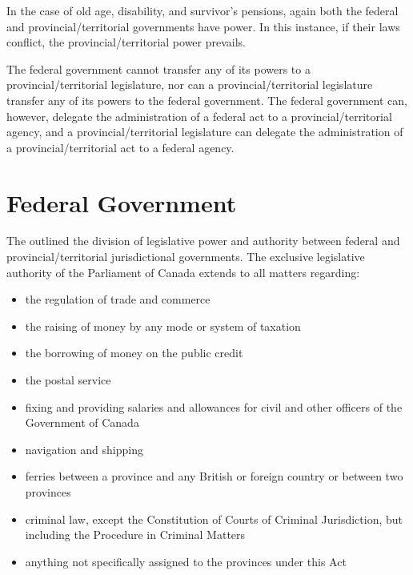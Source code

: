 \documentclass[letterpaper,10pt,english]{sphinxmanual}
\begin{document}
\sphinxAtStartPar
In the case of old age, disability, and survivor’s pensions, again both the federal and
provincial/territorial governments have power. In this instance, if their laws conflict, the
provincial/territorial power prevails.

\sphinxAtStartPar
The federal government cannot transfer any of its powers to a provincial/territorial
legislature, nor can a provincial/territorial legislature transfer any of its powers to the federal
government. The federal government can, however, delegate the administration of a federal
act to a provincial/territorial agency, and a provincial/territorial legislature can delegate the
administration of a provincial/territorial act to a federal agency.


\section{Federal Government}
\label{\detokenize{1_introduction:federal-government}}
\sphinxAtStartPar
The  outlined the division of legislative power and authority between
federal and provincial/territorial jurisdictional governments. The exclusive legislative
authority of the Parliament of Canada extends to all matters regarding:
\begin{itemize}
\item {} 
\sphinxAtStartPar
the regulation of trade and commerce

\item {} 
\sphinxAtStartPar
the raising of money by any mode or system of taxation

\item {} 
\sphinxAtStartPar
the borrowing of money on the public credit

\item {} 
\sphinxAtStartPar
the postal service

\item {} 
\sphinxAtStartPar
fixing and providing salaries and allowances for civil and other officers of the Government of Canada

\item {} 
\sphinxAtStartPar
navigation and shipping

\item {} 
\sphinxAtStartPar
ferries between a province and any British or foreign country or between two provinces

\item {} 
\sphinxAtStartPar
criminal law, except the Constitution of Courts of Criminal Jurisdiction, but including the Procedure in Criminal Matters

\item {} 
\sphinxAtStartPar
anything not specifically assigned to the provinces under this Act

\end{itemize}
\end{document}
